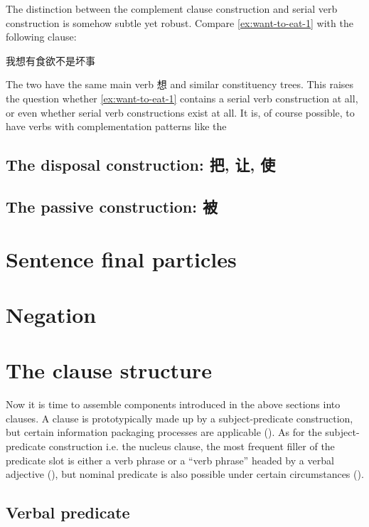 \documentclass[UTF8, a4paper, oneside, scheme=plain]{ctexart}
\begin{document}
The distinction between the complement clause construction %
and serial verb construction is somehow subtle yet robust.
Compare \eqref{ex:want-to-eat-1} with the following clause:
\begin{exe}
    \ex\label{ex:want-to-eat-2} 我想有食欲不是坏事
\end{exe}
The two have the same main verb 想 and similar constituency trees.
This raises the question whether \eqref{ex:want-to-eat-1} contains a serial verb construction at all,
or even whether serial verb constructions exist at all.
It is, of course possible, to have verbs with complementation patterns like the

\subsection{The disposal construction: 把, 让, 使}

\subsection{The passive construction: 被}

\section{Sentence final particles}

\section{Negation}

\section{The clause structure}

Now it is time to assemble components introduced in the above sections into clauses.
A clause is prototypically made up by a subject-predicate construction,
but certain information packaging processes are applicable (). 
As for the subject-predicate construction i.e. the nucleus clause,
the most frequent filler of the predicate slot is either 
a verb phrase or a ``verb phrase'' headed by a verbal adjective (),
but nominal predicate is also possible under certain circumstances (). 


\subsection{Verbal predicate}\label{sec:verbal-predicate}
\end{document}
